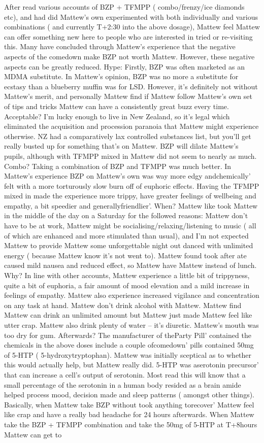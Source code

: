 \documentclass[12pt]{book}
\begin{document}
After read various accounts of BZP + TFMPP ( combo/frenzy/ice diamonds etc), and had did Mattew's own experimented with both individually and various combinations ( and currently T+2:30 into the above dosage), Mattew feel Mattew can offer something new here to people who are interested in tried or re-visiting this. Many have concluded through Mattew's experience that the negative aspects of the comedown make BZP not worth Mattew. However, these negative aspects can be greatly reduced. Hype: Firstly, BZP was often marketed as an MDMA substitute. In Mattew's opinion, BZP was no more a substitute for ecstasy than a blueberry muffin was for LSD. However, it's definitely not without Mattew's merit, and personally Mattew find if Mattew follow Mattew's own set of tips and tricks Mattew can have a consistently great buzz every time. Acceptable? I'm lucky enough to live in New Zealand, so it's legal which eliminated the acquisition and procession paranoia that Mattew might experience otherwise. NZ had a comparatively lax controlled substances list, but you'll get really busted up for something that's on Mattew. BZP will dilate Mattew's pupils, although with TFMPP mixed in Mattew did not seem to nearly as much. Combo? Taking a combination of BZP and TFMPP was much better. In Mattew's experience BZP on Mattew's own was way more edgy andchemically' felt with a more torturously slow burn off of euphoric effects. Having the TFMPP mixed in made the experience more trippy, have greater feelings of wellbeing and empathy, a bit speedier and generallyfriendlier'. When? Mattew like took Mattew in the middle of the day on a Saturday for the followed reasons: Mattew don't have to be at work, Mattew might be socialising/relaxing/listening to music ( all of which are enhanced and more stimulated than usual), and I'm not expected Mattew to provide Mattew some unforgettable night out danced with unlimited energy ( because Mattew know it's not went to). Mattew found took after ate caused mild nausea and reduced effect, so Mattew have Mattew instead of lunch. Why? In line with other accounts, Mattew experience a little bit of trippyness, quite a bit of euphoria, a fair amount of mood elevation and a mild increase in feelings of empathy. Mattew also experience increased vigilance and concentration on any task at hand. Mattew don't drink alcohol with Mattew. Mattew find Mattew can drink an unlimited amount but Mattew just made Mattew feel like utter crap. Mattew also drink plenty of water -- it's diuretic. Mattew's mouth was too dry for gum. Afterwards? The manufacturer of theParty Pill' contained the chemicals in the above doses include a couple ofcomedown' pills contained 50mg of 5-HTP ( 5-hydroxytryptophan). Mattew was initially sceptical as to whether this would actually help, but Mattew really did. 5-HTP was aserotonin precursor' that can increase a cell's output of serotonin. Most read this will know that a small percentage of the serotonin in a human body resided as a brain amide helped process mood, decision made and sleep patterns ( amongst other things). Basically, when Mattew take BZP without took anything torecover' Mattew feel like crap and have a really bad headache for 24 hours afterwards. When Mattew take the BZP + TFMPP combination and take the 50mg of 5-HTP at T+8hours Mattew can get to 
\end{document}
